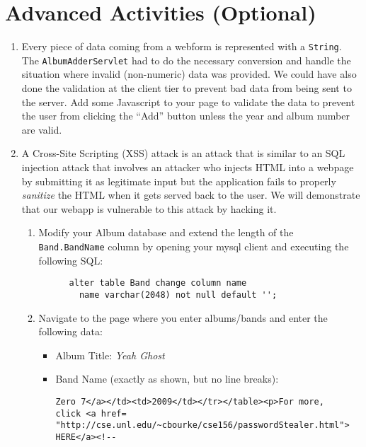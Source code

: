 \documentclass[12pt]{scrartcl}
\begin{document}
\section*{Advanced Activities (Optional)}

\begin{enumerate}
  \item Every piece of data coming from a webform is represented with
    a \texttt{String}. The \texttt{AlbumAdderServlet} 
    had to do the 
    necessary conversion and handle the situation where invalid 
    (non-numeric) data was provided.   We could have also done the 
    validation at the client tier to prevent bad data from being 
    sent to the server.  Add some Javascript to your page to validate 
    the data to prevent the user from clicking the ``Add'' button 
    unless the year and album number are valid.  
  \item A Cross-Site Scripting (XSS) attack is an attack that is 
    similar to an SQL injection attack that involves an attacker who 
    injects HTML into a webpage by submitting it as legitimate input 
    but the application fails to properly \emph{sanitize} the HTML 
    when it gets served back to the user.  We will demonstrate that 
    our webapp is vulnerable to this attack by hacking it.
    \begin{enumerate}
      \item Modify your Album database and extend the length of the 
      \texttt{Band.BandName} column by opening your mysql 
      client and executing the following SQL:
      
      \begin{verbatim}
      alter table Band change column name
        name varchar(2048) not null default '';
      \end{verbatim}
      
      \item Navigate to the page where you enter albums/bands and enter 
      the following data:
      \begin{itemize}
        \item Album Title: \emph{Yeah Ghost}
        \item Band Name (exactly as shown, but no line breaks): 

\begin{verbatim}
Zero 7</a></td><td>2009</td></tr></table><p>For more, 
click <a href=
"http://cse.unl.edu/~cbourke/cse156/passwordStealer.html">
HERE</a><!--
\end{verbatim}


\end{itemize}
\end{enumerate}
\end{enumerate}
\end{document}
